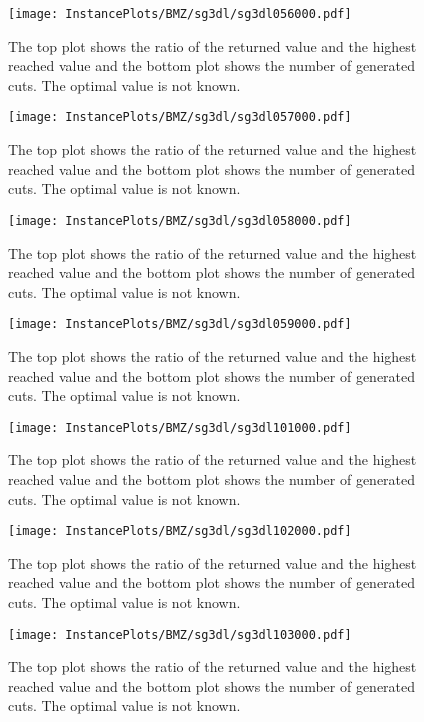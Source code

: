 \documentclass[10pt,a4paper]{article}
\begin{document}
\begin{figure}[H]
\texttt{[image: InstancePlots/BMZ/sg3dl/sg3dl056000.pdf]}
\caption{The top plot shows the ratio of the returned value and the highest reached value     and the bottom plot shows the number of generated cuts. The optimal value is not known.}
\end{figure}

\begin{figure}[H]
\texttt{[image: InstancePlots/BMZ/sg3dl/sg3dl057000.pdf]}
\caption{The top plot shows the ratio of the returned value and the highest reached value     and the bottom plot shows the number of generated cuts. The optimal value is not known.}
\end{figure}

\begin{figure}[H]
\texttt{[image: InstancePlots/BMZ/sg3dl/sg3dl058000.pdf]}
\caption{The top plot shows the ratio of the returned value and the highest reached value     and the bottom plot shows the number of generated cuts. The optimal value is not known.}
\end{figure}

\begin{figure}[H]
\texttt{[image: InstancePlots/BMZ/sg3dl/sg3dl059000.pdf]}
\caption{The top plot shows the ratio of the returned value and the highest reached value     and the bottom plot shows the number of generated cuts. The optimal value is not known.}
\end{figure}

\begin{figure}[H]
\texttt{[image: InstancePlots/BMZ/sg3dl/sg3dl101000.pdf]}
\caption{The top plot shows the ratio of the returned value and the highest reached value     and the bottom plot shows the number of generated cuts. The optimal value is not known.}
\end{figure}

\begin{figure}[H]
\texttt{[image: InstancePlots/BMZ/sg3dl/sg3dl102000.pdf]}
\caption{The top plot shows the ratio of the returned value and the highest reached value     and the bottom plot shows the number of generated cuts. The optimal value is not known.}
\end{figure}

\begin{figure}[H]
\texttt{[image: InstancePlots/BMZ/sg3dl/sg3dl103000.pdf]}
\caption{The top plot shows the ratio of the returned value and the highest reached value     and the bottom plot shows the number of generated cuts. The optimal value is not known.}
\end{figure}
\end{document}
